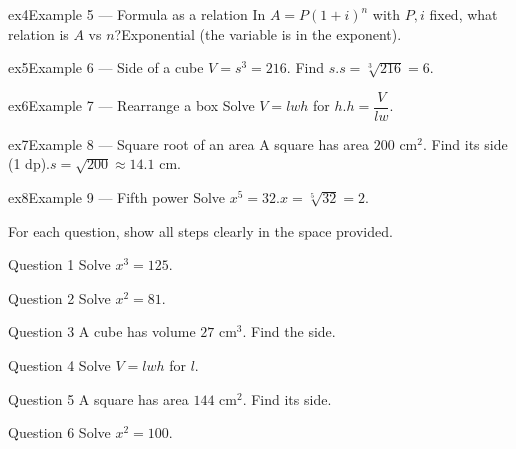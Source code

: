 \documentclass[11pt]{article}
\begin{document}
\begin{example}{ex4}{Example 5 --- Formula as a relation}
In $A=P(1+i)^n$ with $P,i$ fixed, what relation is $A$ vs $n$?\soln Exponential (the variable is in the exponent).
\end{example}

\begin{example}{ex5}{Example 6 --- Side of a cube}
$V=s^3=216$. Find $s$.\soln $s=\sqrt[3]{216}=6$.
\end{example}

\begin{example}{ex6}{Example 7 --- Rearrange a box}
Solve $V=lwh$ for $h$.\soln $h=\dfrac{V}{lw}$.
\end{example}

\begin{example}{ex7}{Example 8 --- Square root of an area}
A square has area $200$ cm$^2$. Find its side (1 dp).\soln $s=\sqrt{200}\approx14.1$ cm.
\end{example}

\begin{example}{ex8}{Example 9 --- Fifth power}
Solve $x^{5}=32$.\soln $x=\sqrt[5]{32}=2$.
\end{example}

\clearpage
{}
For each question, show all steps clearly in the space provided.

\begin{qbox}{Question 1}
Solve $x^{3}=125$.\workspace{2.4cm}
\end{qbox}

\begin{qbox}{Question 2}
Solve $x^{2}=81$.\workspace{2.4cm}
\end{qbox}

\begin{qbox}{Question 3}
A cube has volume $27$ cm$^3$. Find the side.\workspace{2.4cm}
\end{qbox}

\begin{qbox}{Question 4}
Solve $V=lwh$ for $l$.\workspace{2.4cm}
\end{qbox}

\begin{qbox}{Question 5}
A square has area $144$ cm$^2$. Find its side.\workspace{2.4cm}
\end{qbox}

\begin{qbox}{Question 6}
Solve $x^{2}=100$.\workspace{2.4cm}
\end{qbox}
\end{document}
